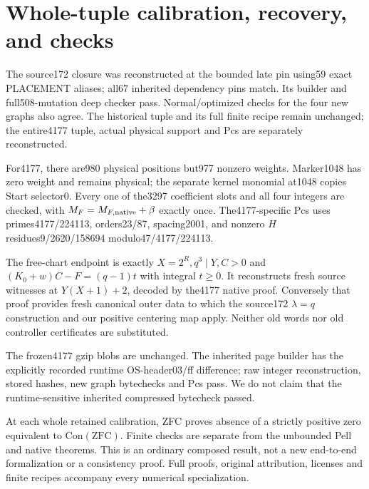 \section{Whole-tuple calibration, recovery, and checks}
The source172 closure was reconstructed at the bounded late pin using59
exact PLACEMENT aliases; all67 inherited dependency pins match. Its
builder and full508-mutation deep checker pass. Normal/optimized checks
for the four new graphs also agree. The historical tuple and its full
finite recipe remain unchanged; the entire4177 tuple, actual physical
support and Pcs are separately reconstructed.

For4177, there are980 physical positions but977 nonzero weights. Marker1048
has zero weight and remains physical; the separate kernel monomial at1048
copies Start selector0. Every one of the3297 coefficient slots and all
four integers are checked, with $M_F=M_{F,\rm native}+\beta$ exactly once.
The4177-specific Pcs uses primes4177/224113, orders23/87, spacing2001,
and nonzero $H$ residues9/2620/158694 modulo47/4177/224113.

The free-chart endpoint is exactly $X=2^R,q^3\mid Y,C>0$ and
$(K_0+w)C-F=(q-1)t$ with integral $t\ge0$. It reconstructs fresh source
witnesses at $Y(X+1)+2$, decoded by the4177 native proof. Conversely that
proof provides fresh canonical outer data to which the source172
$\lambda=q$ construction and our positive centering map apply.
Neither old words nor old controller certificates are substituted.

The frozen4177 gzip blobs are unchanged. The inherited page builder
has the explicitly recorded runtime OS-header03/ff difference; raw integer
reconstruction, stored hashes, new graph bytechecks and Pcs pass. We do
not claim that the runtime-sensitive inherited compressed bytecheck passed.

At each whole retained calibration, ZFC proves absence of a strictly
positive zero equivalent to $\mathrm{Con}(\mathrm{ZFC})$. Finite checks
are separate from the unbounded Pell and native theorems. This is an
ordinary composed result, not a new end-to-end formalization or a
consistency proof. Full proofs, original attribution, licenses and finite
recipes accompany every numerical specialization.
